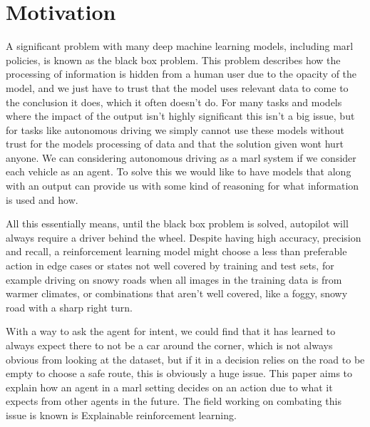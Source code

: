 \documentclass[UKenglish]{uiomasterthesis}
\begin{document}
\section{Motivation}
\label{sec:motivation}
A significant problem with many deep machine learning models, including \ac{marl} policies, is known as the black box problem\cite{zednik2019solving}. This problem describes how the processing of information is hidden from a human user due to the opacity of the model, and we just have to trust that the model uses relevant data to come to the conclusion it does, which it often doesn't do. For many tasks and models where the impact of the output isn't highly significant this isn't a big issue, but for tasks like autonomous driving we simply cannot use these models without trust for the models processing of data and that the solution given wont hurt anyone. We can considering autonomous driving as a \ac{marl} system if we consider each vehicle as an agent. To solve this we would like to have models that along with an output can provide us with some kind of reasoning for what information is used and how.

All this essentially means, until the black box problem is solved, autopilot will always require a driver behind the wheel\cite{tian2018deeptest}. Despite having high accuracy, precision and recall, a reinforcement learning model might choose a less than preferable action in edge cases or states not well covered by training and test sets, for example driving on snowy roads when all images in the training data is from warmer climates, or combinations that aren't well covered, like a foggy, snowy road with a sharp right turn.

With a way to ask the agent for intent, we could find that it has learned to always expect there to not be a car around the corner, which is not always obvious from looking at the dataset, but if it in a decision relies on the road to be empty to choose a safe route, this is obviously a huge issue. This paper aims to explain how an agent in a \ac{marl} setting decides on an action due to what it expects from other agents in the future. The field working on combating this issue is known is Explainable reinforcement learning.
\end{document}
